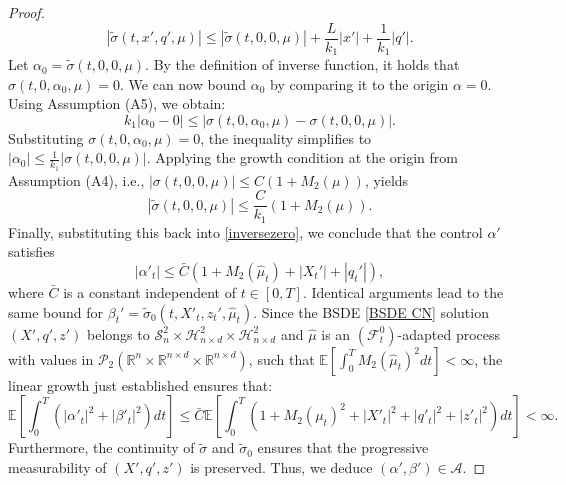 \documentclass[11pt,a4paper]{article}
\begin{document}
\begin{proof}
\begin{equation}
\label{inversezero}
    |\tilde{\sigma}(t, x', q', \mu)| \leq |\tilde{\sigma}(t, 0, 0, \mu)| + \frac{L}{k_1} |x'| + \frac{1}{k_1} |q'|.
\end{equation}
Let \(\alpha_0 = \tilde{\sigma}(t, 0, 0, \mu)\). By the definition of inverse function, it holds that \(\sigma(t, 0, \alpha_0, \mu) = 0\). We can now bound \(\alpha _{0}\) by comparing it to the origin \(\alpha = 0\). Using Assumption (A5), we obtain:
$$k_1 |\alpha_0 - 0| \leq |\sigma(t, 0, \alpha_0, \mu) - \sigma(t, 0, 0, \mu)|.$$
Substituting \(\sigma(t, 0, \alpha_0, \mu) = 0\), the inequality simplifies to
$|\alpha_0| \leq \frac{1}{k_1} |\sigma(t, 0, 0, \mu)|$.
Applying the growth condition at the origin from Assumption (A4), i.e., \(|\sigma(t, 0, 0, \mu)| \leq C(1 + M_2(\mu))\), yields 
$$|\tilde{\sigma}(t, 0, 0, \mu)| \leq \frac{C}{k_1}(1 + M_2(\mu)).
$$
Finally, substituting this back into \eqref{inversezero}, we conclude that the control \(\alpha'\) satisfies
$$|\alpha'_t| \leq \bar{C}(1 + M_2(\hat\mu_t) + |X_t '| + |q_t '|),$$
where \(\bar{C}\) is a constant independent of \(t \in [0, T]\). Identical arguments lead to the same bound for \(\beta_t ' = \tilde{\sigma}_0(t, X'_t, z_t ', \hat \mu_t)\).
Since the BSDE \eqref{BSDE CN} solution $(X', q', z')$ belongs to $\mathcal S^2_n \times  \mathcal H^2_{n \times d}\times \mathcal H^2_{n\times d}$ and  $\hat \mu$ is an $(\mathcal F_t ^0)$-adapted process with values in $\mathcal{P}_2(\mathbb{R}^n\times \mathbb{R}^{n\times d} \times \mathbb{R}^{n\times d})$, such that $\mathbb E \left[\int_0^T M_2(\hat \mu_t)^2 dt\right]<\infty$, the linear growth just established ensures that:
\[ \mathbb{E} \left[ \int_0^T (|\alpha'_t|^2+ |\beta'_t|^2)dt \right] \leq \bar{C}\mathbb{E} \left[\int_0^T (1 + M_2(\mu_t)^2+ |X'_t|^2 +|q'_t|^2+ |z'_t|^2) dt \right] < \infty. \]
Furthermore, the continuity of $\tilde{\sigma}$ and $\tilde{\sigma}_0$ ensures that the progressive measurability of $(X', q', z')$ is preserved. Thus, we deduce $(\alpha', \beta') \in \mathcal{A}$.


\end{proof}
\end{document}
